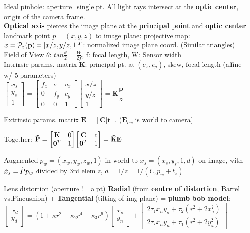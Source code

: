 \documentclass[10pt,landscape]{article}
\begin{document}
\begin{multicols}{3}
Ideal pinhole: aperture=single pt. All light rays intersect at the \textbf{optic center}, origin of the camera frame.\\
\textbf{Optical axis} pierces the image plane at the \textbf{principal point} and 
\textbf{optic center}
landmark point $p = (x,y,z) $ to image plane: projective map:
$\Bar{x} = \mathcal{P}_z(\mathbf{p}) = [x/z, y/z, 1]^T$: normalized image plane coord. (Similar triangles)\\
Field of View $\theta$: $tan\frac{\theta}{2} = \frac{W}{2f}$, f: focal length, W: Sensor width\\
Intrinsic params. matrix $\mathbf{K}$: principal pt. at $(c_x, c_y)$, skew, focal length (affine w/ 5 parameters)\\
 $\begin{bmatrix} x_s \\ y_s \\ 1\end{bmatrix} = \begin{bmatrix} f_x & s & c_x \\ 0 & f_y & c_y \\ 0 & 0 & 1\end{bmatrix}\begin{bmatrix} x/z \\ y/z \\ 1\end{bmatrix} = \mathbf{K}\dfrac{\mathbf{p}}{z}$

Extrinsic params. matrix $\mathbf{E}=[\mathbf{C}|\mathbf{t}]$. ($\mathbf{E}_{cw}$ is world to camera)

Together:
$\mathbf{\Tilde{P}} = \begin{bmatrix} \mathbf{K} & 0 \\ \mathbf{0}^T & 1\end{bmatrix}\begin{bmatrix} \mathbf{C} & \mathbf{t} \\ \mathbf{0}^T & 1\end{bmatrix} = \Tilde{\mathbf{K}}\mathbf{E}$

Augmented $p_w = (x_w, y_w, z_w, 1)$ in world to $x_s = (x_s, y_s, 1, d)$ on image, with $\Tilde{x}_s = \Tilde{P}\Bar{p}_w$ divided by 3rd elem $z$, $d=1/z=1/(C_zp_w+t_z)$

Lens distortion (aperture != a pt)
\textbf{Radial} (from \textbf{centre of distortion}, Barrel vs.Pincushion) + \textbf{Tangential} (tilting of img plane) = \textbf{plumb bob model}: $\begin{bmatrix} x_d \\ y_d \end{bmatrix} = (1 + \kappa r^2 + \kappa_2 r^4 + \kappa_3 r^6)\begin{bmatrix} x_n \\ y_n \end{bmatrix} + \begin{bmatrix} 2\tau_1 x_ny_n + \tau_2(r^2 + 2x_n^2) \\ 2\tau_2 x_ny_n + \tau_1(r^2 + 2y_n^2) \end{bmatrix}$


\end{multicols}
\end{document}
